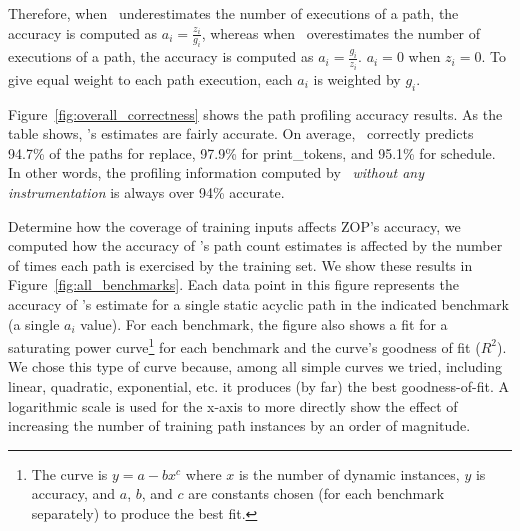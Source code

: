 Therefore, when \zop\ underestimates the number of executions of a path, the accuracy is computed as $a_i = \frac{z_i}{g_i}$, whereas when \zop\ overestimates the number of executions of a path, the accuracy is computed as $a_i = \frac{g_i}{z_i}$. $a_i = 0$ when $z_i=0$. To give equal weight to each path execution, each $a_i$ is weighted by $g_i$.

Figure~\ref{fig:overall_correctness} shows the path profiling accuracy results. As the table shows, \zop's estimates are fairly accurate.  On average, \zop\ correctly predicts 94.7\% of the paths for replace, 97.9\% for print\_tokens, and 95.1\% for schedule. In other words, the profiling information computed by \zop\ \textit{without any instrumentation} is always over 94\% accurate.

Determine how the coverage of training inputs affects ZOP's accuracy, we computed how the accuracy of \zop's path count estimates is affected by the number of times each path is exercised by the training set. We show these results in Figure~\ref{fig:all_benchmarks}.  Each data point in this figure represents the accuracy of \zop's estimate for a single static acyclic path in the indicated benchmark (\ie a single $a_i$ value). For each benchmark, the figure also shows a fit for a saturating power curve\footnote{The curve is $y=a-bx^c$ where $x$ is the number of dynamic instances, $y$ is accuracy, and $a$, $b$, and $c$ are constants chosen (for each benchmark separately) to produce the best fit.} for each benchmark and the curve's goodness of fit (\ie $R^2$). We chose this type of curve because, among all simple curves we tried, including linear, quadratic, exponential, etc. it produces (by far) the best goodness-of-fit.  A logarithmic scale is used for the x-axis to more directly show the effect of increasing the number of training path instances by an order of magnitude.

